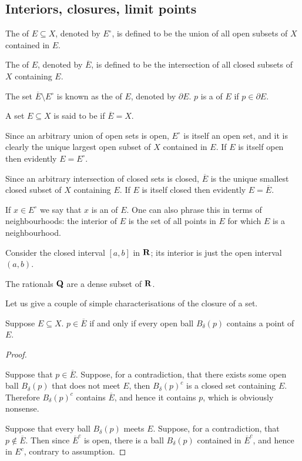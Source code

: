\subsection{Interiors, closures, limit points}
\begin{definition}
The  of $E\subseteq X$, denoted by $E^\circ$, is defined to be the union of all open subsets of $X$ contained in $E$.

The  of $E$, denoted by $\overline{E}$, is defined to be the intersection of all closed subsets of $X$ containing $E$.

The set $\overline{E}\setminus E^\circ$ is known as the  of $E$, denoted by $\partial E$. $p$ is a  of $E$ if $p\in\partial E$.

A set $E\subseteq X$ is said to be  if $\overline{E}=X$.
\end{definition}

Since an arbitrary union of open sets is open, $E^\circ$ is itself an open set, and it is clearly the unique largest open subset of $X$ contained in $E$. If $E$ is itself open then evidently $E=E^\circ$.

Since an arbitrary intersection of closed sets is closed, $\overline{E}$ is the unique smallest closed subset of $X$ containing $E$. If $E$ is itself closed then evidently $E=\overline{E}$.

If $x\in E^\circ$ we say that $x$ is an  of $E$. One can also phrase this in terms of neighbourhoods: the interior of $E$ is the set of all points in $E$ for which $E$ is a neighbourhood.

\begin{example}
Consider the closed interval $[a,b]$ in $\mathbf R$; its interior is just the open interval $(a,b)$.

The rationals $\mathbf Q$ are a dense subset of $\mathbf R$.
\end{example}

Let us give a couple of simple characterisations of the closure of a set.

\begin{proposition}
Suppose $E\subseteq X$. $p\in\overline{E}$ if and only if every open ball $B_\delta(p)$ contains a point of $E$.
\end{proposition}

\begin{proof} \

\fbox{$\implies$} Suppose that $p\in\overline{E}$. Suppose, for a contradiction, that there exists some open ball $B_\delta(p)$ that does not meet $E$, then $B_\delta(p)^c$ is a closed set containing $E$. Therefore $B_\delta(p)^c$ contains $\overline{E}$, and hence it contains $p$, which is obviously nonsense.

\fbox{$\impliedby$} Suppose that every ball $B_\delta(p)$ meets $E$. Suppose, for a contradiction, that $p\notin\overline{E}$. Then since $\overline{E}^c$ is open, there is a ball $B_\delta(p)$ contained in $\overline{E}^c$, and hence in $E^c$, contrary to assumption.
\end{proof}

